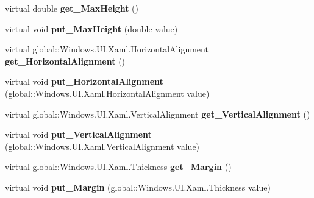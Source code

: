 \begin{DoxyCompactItemize}
virtual double {\bfseries get\+\_\+\+Max\+Height} ()
\item 
\mbox{\label{class_windows_1_1_u_i_1_1_xaml_1_1_framework_element_ae1670c631585c95315bf11dbfca78d7b}} 
virtual void {\bfseries put\+\_\+\+Max\+Height} (double value)
\item 
\mbox{\label{class_windows_1_1_u_i_1_1_xaml_1_1_framework_element_a194e28f5181a35d09b2dd21f497fe3d1}} 
virtual global\+::\+Windows.\+U\+I.\+Xaml.\+Horizontal\+Alignment {\bfseries get\+\_\+\+Horizontal\+Alignment} ()
\item 
\mbox{\label{class_windows_1_1_u_i_1_1_xaml_1_1_framework_element_a7001e4c656cec6442ed23dc39bcdf7e4}} 
virtual void {\bfseries put\+\_\+\+Horizontal\+Alignment} (global\+::\+Windows.\+U\+I.\+Xaml.\+Horizontal\+Alignment value)
\item 
\mbox{\label{class_windows_1_1_u_i_1_1_xaml_1_1_framework_element_acfc460d0c6c8e311fe72b9ec4e4a167f}} 
virtual global\+::\+Windows.\+U\+I.\+Xaml.\+Vertical\+Alignment {\bfseries get\+\_\+\+Vertical\+Alignment} ()
\item 
\mbox{\label{class_windows_1_1_u_i_1_1_xaml_1_1_framework_element_aba9ea4c55cf725923ab5b187ab461767}} 
virtual void {\bfseries put\+\_\+\+Vertical\+Alignment} (global\+::\+Windows.\+U\+I.\+Xaml.\+Vertical\+Alignment value)
\item 
\mbox{\label{class_windows_1_1_u_i_1_1_xaml_1_1_framework_element_acd5d4f2d24189eebb96488bffcf0e52e}} 
virtual global\+::\+Windows.\+U\+I.\+Xaml.\+Thickness {\bfseries get\+\_\+\+Margin} ()
\item 
\mbox{\label{class_windows_1_1_u_i_1_1_xaml_1_1_framework_element_a530e383a49fbab5e2b808a8709af8cef}} 
virtual void {\bfseries put\+\_\+\+Margin} (global\+::\+Windows.\+U\+I.\+Xaml.\+Thickness value)
\item 
\mbox{\label{class_windows_1_1_u_i_1_1_xaml_1_1_framework_element_af75a0b9279cd88b148a7a58c3ee46d75}} 

\end{DoxyCompactItemize}
